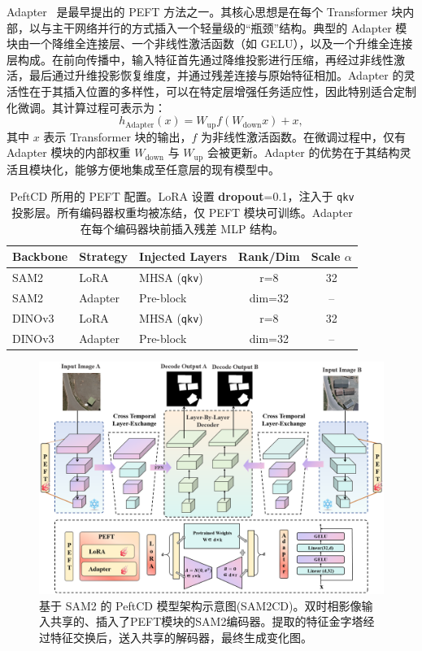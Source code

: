Adapter~\cite{adapter} 是最早提出的 PEFT 方法之一。其核心思想是在每个 Transformer 块内部，以与主干网络并行的方式插入一个轻量级的“瓶颈”结构。典型的 Adapter 模块由一个降维全连接层、一个非线性激活函数（如 GELU），以及一个升维全连接层构成。在前向传播中，输入特征首先通过降维投影进行压缩，再经过非线性激活，最后通过升维投影恢复维度，并通过残差连接与原始特征相加。Adapter 的灵活性在于其插入位置的多样性，可以在特定层增强任务适应性，因此特别适合定制化微调。其计算过程可表示为：
\begin{equation}
    h_{\text{Adapter}}(x) = W_{\text{up}} f(W_{\text{down}} x) + x,
    \label{eq:adapter}
\end{equation}
其中 $x$ 表示 Transformer 块的输出，$f$ 为非线性激活函数。在微调过程中，仅有 Adapter 模块的内部权重 $W_{\text{down}}$ 与 $W_{\text{up}}$ 会被更新。Adapter 的优势在于其结构灵活且模块化，能够方便地集成至任意层的现有模型中。


\begin{table}[!htbp]
\centering
\caption{PeftCD 所用的 PEFT 配置。LoRA 设置 \textbf{dropout}=0.1，注入于 \texttt{qkv} 投影层。所有编码器权重均被冻结，仅 PEFT 模块可训练。Adapter 在每个编码器块前插入残差 MLP 结构。}
\label{tab:peftcd_cfg}
\begin{tabular}{l l l c c}
\toprule
\textbf{Backbone} & \textbf{Strategy} & \textbf{Injected Layers} & \textbf{Rank/Dim} & \textbf{Scale $\alpha$} \\
\midrule
SAM2   & LoRA    & MHSA (\texttt{qkv})    & r=8   & 32 \\
SAM2   & Adapter & Pre-block    & dim=32 & -- \\
DINOv3 & LoRA    & MHSA (\texttt{qkv})     & r=8   & 32 \\
DINOv3 & Adapter & Pre-block     & dim=32 & -- \\
\bottomrule
\end{tabular}
\end{table}

\begin{figure}[!htbp]
  \centering
  \includegraphics[width=\textwidth]{paper_figures/基于AI基础模型微调的变化检测模型研究/PeftCD/peftcd_sam2cd.png}
  \caption{基于 SAM2 的 PeftCD 模型架构示意图(SAM2CD)。双时相影像输入共享的、插入了PEFT模块的SAM2编码器。提取的特征金字塔经过特征交换后，送入共享的解码器，最终生成变化图。}
  \label{fig:peftcd_sam2cd}
\end{figure}


